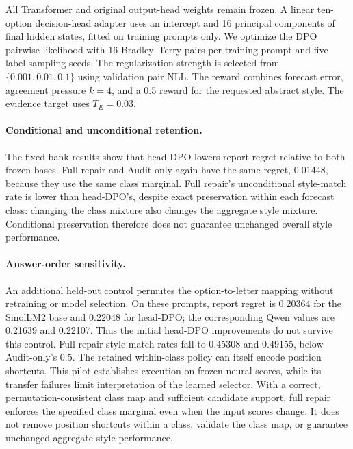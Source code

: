 \documentclass{article}
\begin{document}
All Transformer and original output-head weights remain frozen. A linear
ten-option decision-head adapter uses an intercept and 16 principal
components of final hidden states, fitted on training prompts only. We
optimize the DPO pairwise likelihood with 16 Bradley--Terry pairs per
training prompt and five label-sampling seeds. The regularization strength
is selected from $\{0.001,0.01,0.1\}$ using validation pair NLL. The reward
combines forecast error, agreement pressure $k=4$, and a 0.5 reward for the
requested abstract style. The evidence target uses $T_E=0.03$.



\paragraph{Conditional and unconditional retention.}
The fixed-bank results show that head-DPO lowers report regret relative
to both frozen bases. Full repair and Audit-only again have the same
regret, 0.01448, because they use the same class marginal. Full repair's
unconditional style-match rate is lower than head-DPO's, despite exact
preservation within each forecast class: changing the class mixture also
changes the aggregate style mixture. Conditional preservation therefore
does not guarantee unchanged overall style performance.

\paragraph{Answer-order sensitivity.}
An additional held-out control permutes the option-to-letter mapping
without retraining or model selection. On these prompts, report regret
is 0.20364 for the SmolLM2 base and 0.22048 for head-DPO; the corresponding
Qwen values are 0.21639 and 0.22107. Thus the initial head-DPO improvements
do not survive this control. Full-repair style-match rates fall to 0.45308
and 0.49155, below Audit-only's 0.5. The retained within-class policy can
itself encode position shortcuts. This pilot establishes execution on
frozen neural scores, while its transfer failures limit interpretation
of the learned selector.
With a correct, permutation-consistent class map and sufficient candidate
support, full repair enforces the specified class marginal even when the
input scores change. It does not remove position shortcuts within a class,
validate the class map, or guarantee unchanged aggregate style performance.
\end{document}
